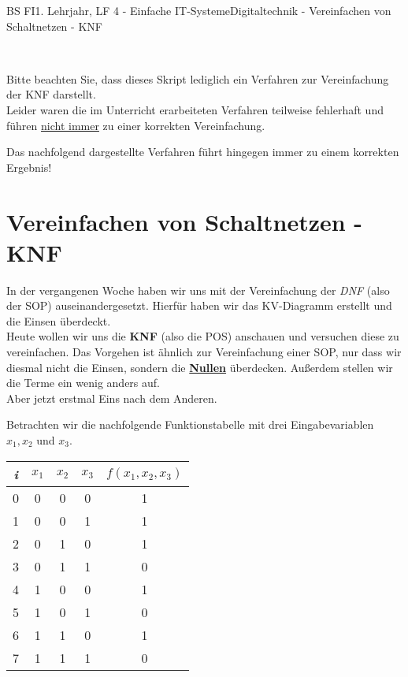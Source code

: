 \documentclass[11pt,twocolumn,oneside,openany,headings=optiontotoc,11pt,numbers=noenddot]{article}
\begin{document}
	\begin{worksheet}{BS FI}{1. Lehrjahr, LF 4 - Einfache IT-Systeme}{Digitaltechnik - Vereinfachen von Schaltnetzen - KNF}
		\begin{framed}
			\centering{}\\
			\normalcolor\raggedright Bitte beachten Sie, dass dieses Skript lediglich ein Verfahren zur Vereinfachung der KNF darstellt.\\
			Leider waren die im Unterricht erarbeiteten Verfahren teilweise fehlerhaft und führen \underline{nicht immer} zu einer korrekten Vereinfachung.\\
			\par\noindent
			Das nachfolgend dargestellte Verfahren führt hingegen immer zu einem korrekten Ergebnis!
		\end{framed}
		\setcounter{section}{1}
		\section{Vereinfachen von Schaltnetzen - KNF}
		In der vergangenen Woche haben wir uns mit der Vereinfachung der \textit{DNF} (also der SOP) auseinandergesetzt. Hierfür haben wir das KV-Diagramm erstellt und die Einsen überdeckt.\\
		Heute wollen wir uns die \textbf{KNF} (also die POS) anschauen und versuchen diese zu vereinfachen. Das Vorgehen ist ähnlich zur Vereinfachung einer SOP, nur dass wir diesmal nicht die Einsen, sondern die \textbf{\underline{Nullen}} überdecken. Außerdem stellen wir die Terme ein wenig anders auf.\\
		Aber jetzt erstmal Eins nach dem Anderen.\\
		\par\noindent
		Betrachten wir die nachfolgende Funktionstabelle mit drei Eingabevariablen \(x_1, x_2\) und \(x_3\).
		\begin{center}
			\begin{tabular}{|c|ccc|c|}
				\hline
				\textit{i} & \(x_1\) & \(x_2\) & \(x_3\) & \(f(x_1,x_2,x_3)\)\\
				\hline
				0 & 0 & 0 & 0 & 1\\
				\hline
				1 & 0 & 0 & 1 & 1\\
				\hline
				2 & 0 & 1 & 0 & 1\\
				\hline
				3 & 0 & 1 & 1 & 0\\
				\hline
				4 & 1 & 0 & 0 & 1\\
				\hline
				5 & 1 & 0 & 1 & 0\\
				\hline
				6 & 1 & 1 & 0 & 1\\
				\hline
				7 & 1 & 1 & 1 & 0\\
				\hline
			\end{tabular}
		\end{center}

\end{worksheet}
\end{document}
